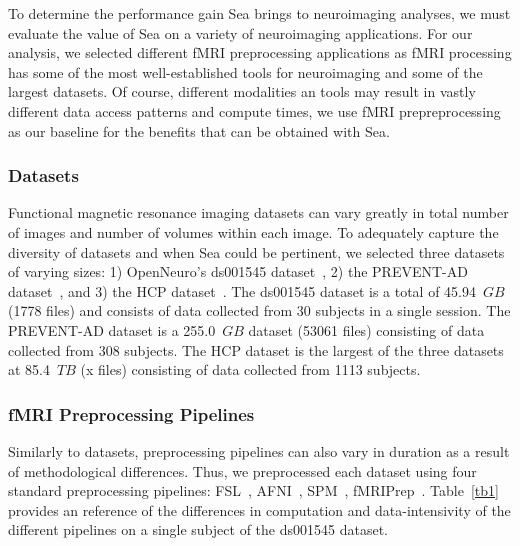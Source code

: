 \documentclass[10pt,journal,compsoc]{IEEEtran}
\begin{document}
To determine the performance gain Sea brings to neuroimaging analyses, we must evaluate the value of Sea on a variety of neuroimaging
applications. For our analysis, we selected different fMRI preprocessing applications as fMRI processing has some of the most
well-established tools for neuroimaging and some of the largest datasets. Of course, different modalities an tools may result in
vastly different data access patterns and compute times, we use fMRI prepreprocessing as our baseline for the benefits that can be
obtained with Sea. 



\subsubsection{Datasets}
Functional magnetic resonance imaging datasets can vary greatly in total number
of images and number of volumes within each image. To adequately capture the 
diversity of datasets and when Sea could be pertinent, we selected three datasets of varying
sizes: 1) OpenNeuro's ds001545 dataset~\cite{ds001545}, 2) the PREVENT-AD  dataset~\cite{preventad}, and
3) the HCP dataset~\cite{hcp}. The ds001545 dataset is a total of 45.94~$GB$ (1778 files) and consists of data collected
from 30 subjects in a single session. The PREVENT-AD dataset is a 255.0~$GB$ dataset (53061 files) consisting of data collected
from 308 subjects. The HCP dataset is the largest of the three datasets at 85.4~$TB$ (x files) consisting of data collected from
1113 subjects.



\subsubsection{fMRI Preprocessing Pipelines}

Similarly to datasets, preprocessing pipelines can also vary in duration as a result of methodological differences.
Thus, we preprocessed each dataset using four standard preprocessing pipelines: FSL~\cite{fsl}, AFNI~\cite{AFNI},
SPM~\cite{SPM}, fMRIPrep~\cite{fmriprep}. Table~\ref{tb1} provides an reference of the differences in computation and data-intensivity
of the different pipelines on a single subject of the ds001545 dataset.
\end{document}
